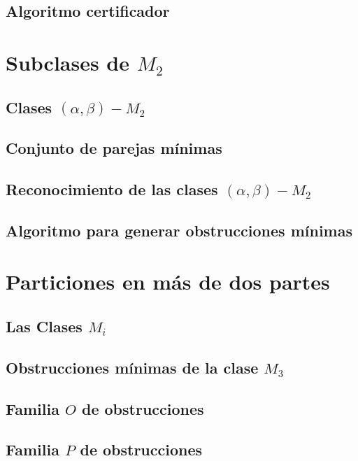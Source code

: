     \subsection{Algoritmo certificador}
        

\section{Subclases de $M_2$}

    \subsection{Clases $(\alpha, \beta)-M_2$}

    \subsection{Conjunto de parejas mínimas}

    \subsection{Reconocimiento de las clases $(\alpha, \beta)-M_2$}

    \subsection{Algoritmo para generar obstrucciones mínimas}

\section{Particiones en más de dos partes}
    \subsection{Las Clases $M_i$}

    \subsection{Obstrucciones mínimas de la clase $M_3$}
        

    \subsection{Familia $O$ de obstrucciones}

    \subsection{Familia $P$ de obstrucciones}
